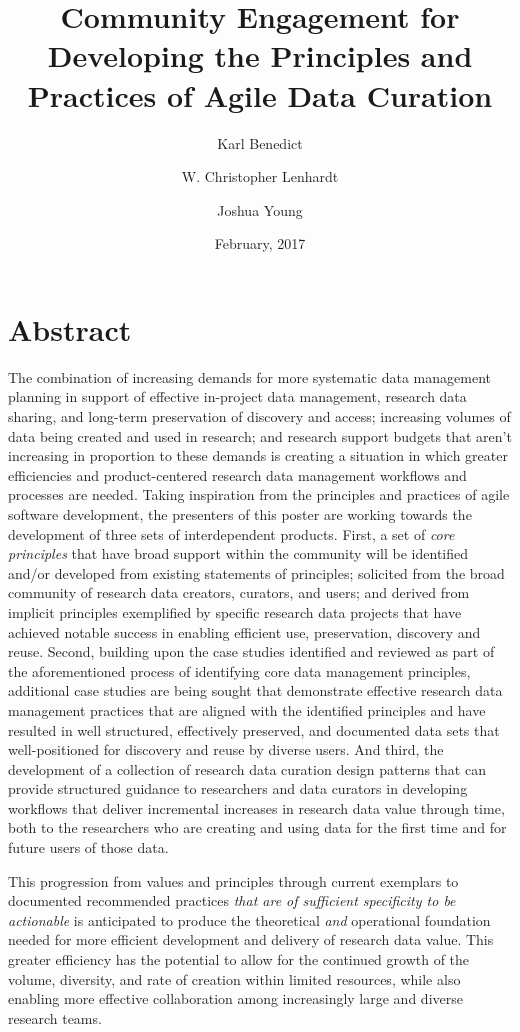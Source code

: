 \documentclass[poster,17]{idcc}
\title{Community Engagement for Developing the Principles and Practices of
Agile Data Curation}
\author{Karl Benedict}
\affil{University Libraries, University of New Mexico}
\author{W. Christopher Lenhardt}
\affil{Renaissance Computing Institute (RENCI)}
\author{Joshua Young}
\affil{University Corporation for Atmospheric Research (UCAR)}
\date{February, 2017}
\begin{document}
\maketitle

\section{Abstract}
The combination of increasing demands for more systematic data
management planning in support of effective in-project data management,
research data sharing, and long-term preservation of discovery and
access; increasing volumes of data being created and used in research;
and research support budgets that aren't increasing in proportion to
these demands is creating a situation in which greater efficiencies and
product-centered research data management workflows and processes are
needed. Taking inspiration from the principles and practices of agile
software development, the presenters of this poster are working towards
the development of three sets of interdependent products. First, a set
of \emph{core principles} that have broad support within the community
will be identified and/or developed from existing statements of
principles; solicited from the broad community of research data
creators, curators, and users; and derived from implicit principles
exemplified by specific research data projects that have achieved
notable success in enabling efficient use, preservation, discovery and
reuse. Second, building upon the case studies identified and reviewed as
part of the aforementioned process of identifying core data management
principles, additional case studies are being sought that demonstrate
effective research data management practices that are aligned with the
identified principles and have resulted in well structured, effectively
preserved, and documented data sets that well-positioned for discovery
and reuse by diverse users. And third, the development of a collection
of research data curation design patterns that can provide structured
guidance to researchers and data curators in developing workflows that
deliver incremental increases in research data value through time, both
to the researchers who are creating and using data for the first time
and for future users of those data.

This progression from values and principles through current exemplars to
documented recommended practices \emph{that are of sufficient
specificity to be actionable} is anticipated to produce the theoretical
\emph{and} operational foundation needed for more efficient development
and delivery of research data value. This greater efficiency has the
potential to allow for the continued growth of the volume, diversity,
and rate of creation within limited resources, while also enabling more
effective collaboration among increasingly large and diverse research
teams.
\end{document}
